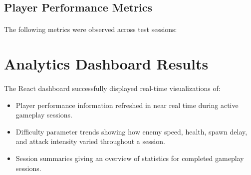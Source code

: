 \subsection{Player Performance Metrics}
\paragraph{} The following metrics were observed across test sessions:

\begin{table}[h!]
\centering
\caption{Comparison of player performance metrics between static difficulty and DDA-enabled modes}
\renewcommand{\arraystretch}{1.3}
\end{table}

\section{Analytics Dashboard Results}
\paragraph{} The React dashboard successfully displayed real-time visualizations of:

\begin{itemize}
	\item Player performance information refreshed in near real time during active gameplay sessions.
	\item Difficulty parameter trends showing how enemy speed, health, spawn delay, and attack intensity varied throughout a session.
	\item Session summaries giving an overview of statistics for completed gameplay sessions.
\end{itemize}

